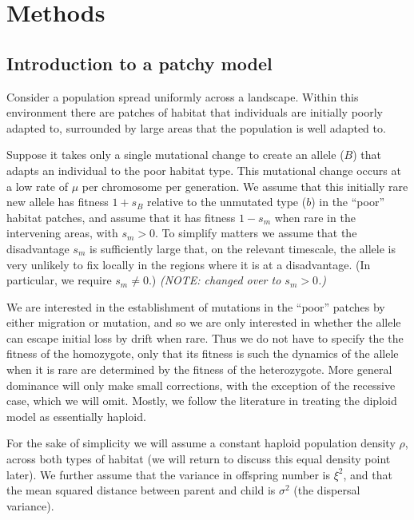 \documentclass{article}
\newcommand{\gc}[1]{{\it\color{green}(#1)} }
\newcommand{\plr}[1]{{\it\color{blue}(#1)}}
\begin{document}
\section{Methods}

\subsection{Introduction to a patchy model}
\label{ss:patchyspace}

Consider a population spread uniformly across a landscape. Within this environment there are patches of
habitat that individuals are initially poorly adapted to, surrounded by large areas that the population is well adapted to. 

Suppose it takes only a single mutational change to create an allele ($B$) that adapts an individual to the
poor habitat type. This mutational change occurs at a low rate of
$\mu$ per chromosome per generation. We assume that this initially rare new
allele has fitness $1+s_B$ relative to the unmutated type ($b$) in the ``poor'' habitat patches,
and assume that it has fitness $1-s_m$ when rare in the intervening areas, with
$s_m>0$. To simplify matters we assume that the disadvantage $s_m$ 
is sufficiently large that, on the relevant timescale,
the allele is very unlikely to fix locally in the regions where it is at a disadvantage.
(In particular, we require $s_m\neq 0$.)
\plr{NOTE: changed over to $s_m>0$.}

We are interested in the establishment of mutations in the ``poor'' patches by either
migration or mutation, and so we are only interested in whether the allele
can escape initial loss by drift when rare. Thus we do not have to
specify the the fitness of the homozygote, only that its
fitness is such the dynamics of the  allele when it is rare are
determined by the fitness of the heterozygote. 
More general dominance will only make small corrections,
with the exception of the recessive case, which we will omit.
Mostly, we follow the literature in treating the diploid model as essentially haploid.

For the sake of simplicity we will assume a constant haploid population density $\rho$, 
across both types of habitat (we will return to discuss this equal
density point later). We further assume that the
variance in offspring number is $\xi^2$, 
and that the mean squared distance between parent and child is $\sigma^2$ (the dispersal variance).
\end{document}
